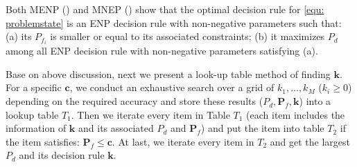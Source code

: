 Both MENP () and MNEP () show that the optimal decision rule for \eqref{equ: problemstate} is an ENP decision rule  with non-negative parameters such that: (a) its $P_{f_i}$ is smaller or equal to its associated constraints; (b) it maximizes $P_d$ among all ENP decision rule with non-negative parameters satisfying (a).

Base on above discussion, 
next we present a look-up table method of finding $\mathbf{k}$. For a specific $\mathbf{c}$, we conduct an exhaustive search over a grid of $k_1, ..., k_M$ ($k_i \geq 0$) depending on the required accuracy and store these results ($P_d, \mathbf{P}_f, \mathbf{k}$) into a lookup table $T_1$. 
Then we iterate every item in Table $T_1$ (each item includes the information of $\mathbf{k}$ and its associated $P_d$ and $\mathbf{P}_f$) and put the item into table $T_2$ if the item satisfies:  $\mathbf{P}_f \leq \mathbf{c}$. At last, we iterate every item in $T_2$ and get the largest $P_d$ and its decision rule $\mathbf{k}$.

